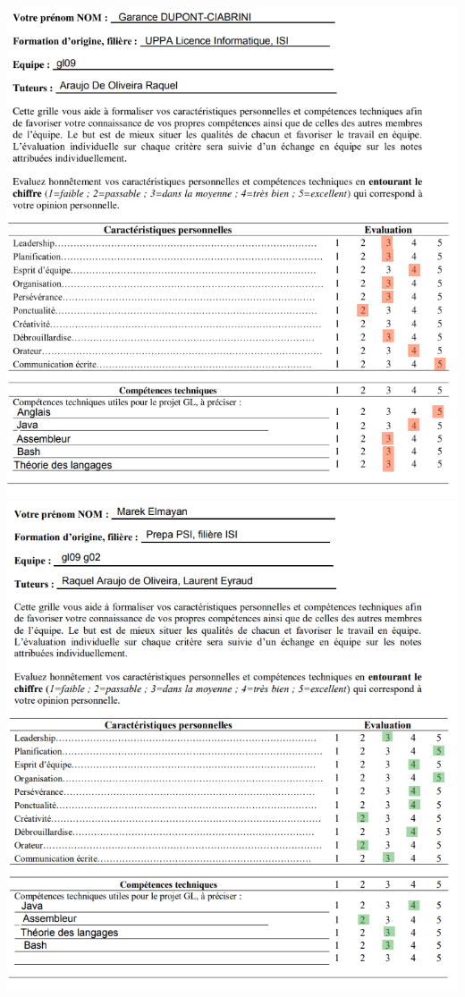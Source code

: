 \documentclass[12pt,a4paper,twoside]{article}
\begin{document}
		\newpage
		\includegraphics[width=1\textwidth]{Evaluation_Garance.png}
		\newpage
		\includegraphics[width=1\textwidth]{Evaluation_Marek.png}
\end{document}
